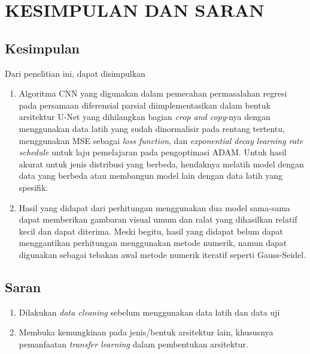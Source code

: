 \chapter{KESIMPULAN DAN SARAN}
\section{Kesimpulan}
Dari penelitian ini, dapat disimpulkan
\begin{enumerate}
    \item Algoritma CNN yang digunakan dalam pemecahan permasalahan regresi pada persamaan diferensial parsial diimplementasikan dalam bentuk arsitektur U-Net yang dihilangkan bagian \textit{crop and copy}-nya dengan menggunakan data latih yang sudah dinormalisir pada rentang tertentu, menggunakan MSE sebagai \textit{loss function}, dan \textit{exponential decay learning rate schedule} untuk laju pemelajaran pada pengoptimasi ADAM. Untuk hasil akurat untuk jenis distribusi yang berbeda, hendaknya melatih model dengan data yang berbeda atau membangun model lain dengan data latih yang spesifik.
    \item Hasil yang didapat dari perhitungan menggunakan dua model sama-sama dapat memberikan gambaran visual umum dan ralat yang dihasilkan relatif kecil dan dapat diterima. Meski begitu, hasil yang didapat belum dapat menggantikan perhitungan menggunakan metode numerik, namun dapat digunakan sebagai tebakan awal metode numerik iteratif seperti Gauss-Seidel.
\end{enumerate}

\section{Saran}
\begin{enumerate}
    \item Dilakukan \textit{data cleaning} sebelum menggunakan data latih dan data uji
    \item Membuka kemungkinan pada jenis/bentuk arsitektur lain, khususnya pemanfaatan \textit{transfer learning} dalam pembentukan arsitektur.
\end{enumerate}